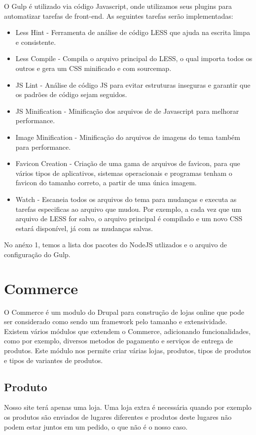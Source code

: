 O Gulp é utilizado via código Javascript, onde utilizamos seus plugins para automatizar tarefas de front-end. As seguintes tarefas serão implementadas:

\begin{itemize}
  \item Less Hint - Ferramenta de análise de código LESS que ajuda na escrita limpa e consistente.
  \item Less Compile - Compila o arquivo principal do LESS, o qual importa todos os outros e gera um CSS minificado e com sourcemap\TODO.
  \item JS Lint - Análise de código JS para evitar estruturas inseguras e garantir que os padrões de código sejam seguidos.
  \item JS Minification - Minificação dos arquivos de de Javascript para melhorar performance.
  \item Image Minification - Minificação do arquivos de imagens do tema também para performance.
  \item Favicon Creation - Criação de uma gama de arquivos de favicon, para que vários tipos de aplicativos, sistemas operacionais e programas tenham o favicon do tamanho correto, a partir de uma  única imagem.
  \item Watch - Escaneia todos os arquivos do tema para mudanças e executa as tarefas especificas ao arquivo que mudou. Por exemplo, a cada vez que um arquivo de LESS for salvo, o arquivo principal é compilado e um novo CSS estará disponível, já com as mudanças salvas.
\end{itemize}

No anéxo 1, temos a lista dos pacotes do NodeJS utlizados e o arquivo de configuração do Gulp.

\section{Commerce}
O Commerce é um modulo do Drupal para construção de lojas online que pode ser considerado como sendo um framework pelo tamanho e extensividade. Existem vários módulos que extendem o Commerce, adicionando funcionalidades, como por exemplo, diversos metodos de pagamento e serviços de entrega de produtos. Este módulo nos permite criar várias lojas, produtos, tipos de produtos e tipos de variantes de produtos.

\subsection{Produto}
Nosso site terá apenas uma loja. Uma loja extra é necessária quando por exemplo os produtos são enviados de lugares diferentes e produtos deste lugares não podem estar juntos em um pedido, o que não é o nosso caso.

